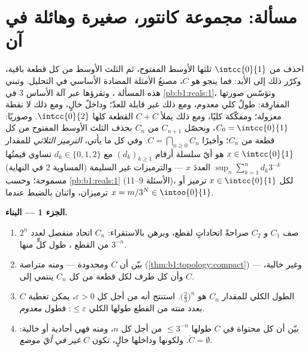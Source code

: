 \section{مسألة: مجموعة كانتور، صغيرة وهائلة في آن}

\begin{problem}[{مسألة نهاية الأسبوع --- \omterm{pb:b1:topology:1}{مجموعة كانتور} ذات الأثلاث
الوسطى: طولها معدوم، وغير قابلة للعدّ، وتامّة، و $C + C =
\intcc{0}{2}$}]
\label{pb:b1:topology:1}
احذف من $\intcc{0}{1}$ ثلثها الأوسط المفتوح، ثم الثلث
الأوسط من كل قطعة باقية، وكرّر ذلك إلى الأبد: فما
ينجو هو \emph{} $C$، مصنعُ الأمثلة المضادة
الأساسي في التحليل. وتبني هذه المسألة ،
وتقرؤها عبر آلة الأساس $3$ في \cref{pb:b1:reals:1}،
وتؤسّس صورتها المفارِقة: طولٌ كلي معدوم، ومع ذلك
غير قابلة للعدّ؛ وداخلٌ خالٍ، ومع ذلك لا نقطة معزولة؛
ومفكّكة كليًا، ومع ذلك يملأ $C + C$ القطعة كلها
$\intcc{0}{2}$. وصوريًا: $C_0 = \intcc{0}{1}$،
ونحصّل $C_{n+1}$ من $C_n$ بحذف الثلث الأوسط
المفتوح من كل قطعة من $C_n$؛ وأخيرًا $C = \bigcap_{n \geq 0}
C_n$. وفي كل ما يأتي، \emph{الترميز الثلاثي} للمقدار $x \in \intcc{0}{1}$
هو أيّ سلسلة أرقام $(d_k)_{k\geq1}$ مع $d_k \in \{0, 1, 2\}$
تساوي قيمتُها $\sup_n \sum_{k=1}^n d_k 3^{-k}$ العددَ $x$ ---
والترميزات غير السليمة (المساوية $2$ في النهاية) مسموحة؛ وحسب
\cref{pb:b1:reals:1} (الأسئلة 9--11)، لكل $x \in
\intcc{0}{1}$ ترميز أو ترميزان، واثنان بالضبط عندما $x = m/3^N
\in \intoo{0}{1}$.

\medskip
\noindent\textbf{الجزء 1 --- البناء.}
\begin{enumerate}
  \item صف $C_1$ و $C_2$ صراحةً اتحاداتٍ لقطع،
        وبرهن بالاستقراء: $C_n$ اتحاد منفصل
        لعدد $2^n$ من القطع ، طول كلٍّ منها $3^{-n}$.
  \item بيّن أن $C$  ومحدودة --- ومنه متراصة
        (\cref{thm:b1:topology:compact}) --- وغير خالية، وأن
        كل طرف لكل قطعة من كل $C_n$ ينتمي
        إلى $C$.
  \item الطول الكلي للمقدار $C_n$ هو $\bigl(\frac23\bigr)^n$.
        استنتج أنه من أجل كل $\varepsilon > 0$، يمكن تغطية  $C$
        بعدد منته من القطع طولها الكلي
        $\leq \varepsilon$: فطول  \emph{معدوم}.
  \item بيّن أن كل  محتواة في $C$ طولها $\leq
        3^{-n}$ من أجل كل $n$، ومنه فهي أحادية أو خالية:
        $\mathring C = \emptyset$. ولكونها  وداخلها
        خالٍ، تكون $C$ \emph{غير  في أيّ موضع}.
\end{enumerate}


\end{problem}
